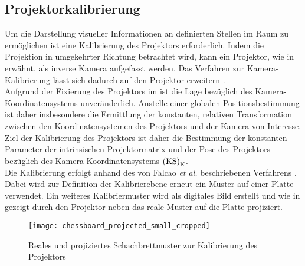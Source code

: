 \prever{
}

\subsection{Projektorkalibrierung}
\label{chap.projcalib}
Um die Darstellung visueller Informationen an definierten Stellen im Raum zu ermöglichen ist eine Kalibrierung des Projektors erforderlich. Indem die Projektion in umgekehrter Richtung betrachtet wird, kann ein Projektor, wie in  erwähnt, als inverse Kamera aufgefasst werden. Das Verfahren zur Kamera-Kalibrierung lässt sich dadurch auf den Projektor erweitern \cite{Falcao2008}.\\

Aufgrund der Fixierung des Projektors im \kps{} ist die Lage bezüglich des Kamera-Koordinatensystems unveränderlich. Anstelle einer globalen Positionsbestimmung ist daher insbesondere die Ermittlung der konstanten, relativen Transformation zwischen den Koordinatensystemen des Projektors und der Kamera von Interesse. Ziel der Kalibrierung des Projektors ist daher die Bestimmung der konstanten Parameter der intrinsischen Projektormatrix und der Pose des Projektors bezüglich des Kamera-Koordinatensystems ${\mathrm{(KS)}}_{\mathrm{K}}$.\\

Die Kalibrierung erfolgt anhand des von Falcao \textit{et al.} beschriebenen Verfahrens \cite{Falcao2008}. Dabei wird zur Definition der Kalibrierebene erneut ein Muster auf einer Platte verwendet. Ein weiteres Kalibriermuster wird als digitales Bild erstellt und wie in  gezeigt durch den Projektor neben das reale Muster auf die Platte projiziert.

\clearpage{}

\begin{figure}[ht]
	\begin{center}
		\texttt{[image: chessboard\_projected\_small\_cropped]}
		\caption{Reales und projiziertes Schachbrettmuster zur Kalibrierung des Projektors}
		\label{fig.projcalib}
	\end{center}
\end{figure}

